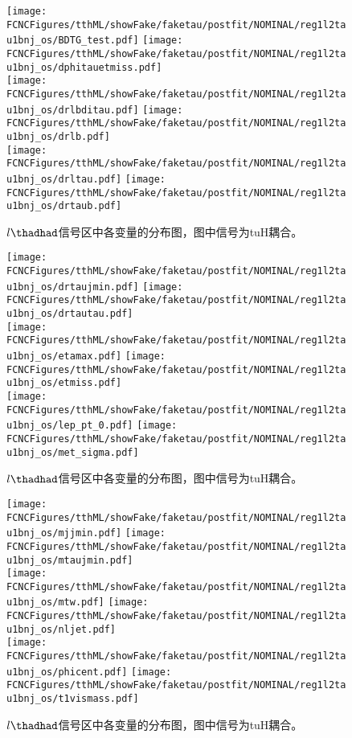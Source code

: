 \begin{figure}[H]
\centering
\texttt{[image: \\FCNCFigures/tthML/showFake/faketau/postfit/NOMINAL/reg1l2tau1bnj\_os/BDTG\_test.pdf]}
\texttt{[image: \\FCNCFigures/tthML/showFake/faketau/postfit/NOMINAL/reg1l2tau1bnj\_os/dphitauetmiss.pdf]}
\\
\texttt{[image: \\FCNCFigures/tthML/showFake/faketau/postfit/NOMINAL/reg1l2tau1bnj\_os/drlbditau.pdf]}
\texttt{[image: \\FCNCFigures/tthML/showFake/faketau/postfit/NOMINAL/reg1l2tau1bnj\_os/drlb.pdf]}
\\
\texttt{[image: \\FCNCFigures/tthML/showFake/faketau/postfit/NOMINAL/reg1l2tau1bnj\_os/drltau.pdf]}
\texttt{[image: \\FCNCFigures/tthML/showFake/faketau/postfit/NOMINAL/reg1l2tau1bnj\_os/drtaub.pdf]}
\\
\caption{$l\thadhad$信号区中各变量的分布图，图中信号为tuH耦合。}
\label{fig:var_reg1l2tau1bnj_os_0}
\end{figure}
\begin{figure}[H]
\centering
\texttt{[image: \\FCNCFigures/tthML/showFake/faketau/postfit/NOMINAL/reg1l2tau1bnj\_os/drtaujmin.pdf]}
\texttt{[image: \\FCNCFigures/tthML/showFake/faketau/postfit/NOMINAL/reg1l2tau1bnj\_os/drtautau.pdf]}
\\
\texttt{[image: \\FCNCFigures/tthML/showFake/faketau/postfit/NOMINAL/reg1l2tau1bnj\_os/etamax.pdf]}
\texttt{[image: \\FCNCFigures/tthML/showFake/faketau/postfit/NOMINAL/reg1l2tau1bnj\_os/etmiss.pdf]}
\\
\texttt{[image: \\FCNCFigures/tthML/showFake/faketau/postfit/NOMINAL/reg1l2tau1bnj\_os/lep\_pt\_0.pdf]}
\texttt{[image: \\FCNCFigures/tthML/showFake/faketau/postfit/NOMINAL/reg1l2tau1bnj\_os/met\_sigma.pdf]}
\\
\caption{$l\thadhad$信号区中各变量的分布图，图中信号为tuH耦合。}
\label{fig:var_reg1l2tau1bnj_os_1}
\end{figure}
\begin{figure}[H]
\centering
\texttt{[image: \\FCNCFigures/tthML/showFake/faketau/postfit/NOMINAL/reg1l2tau1bnj\_os/mjjmin.pdf]}
\texttt{[image: \\FCNCFigures/tthML/showFake/faketau/postfit/NOMINAL/reg1l2tau1bnj\_os/mtaujmin.pdf]}
\\
\texttt{[image: \\FCNCFigures/tthML/showFake/faketau/postfit/NOMINAL/reg1l2tau1bnj\_os/mtw.pdf]}
\texttt{[image: \\FCNCFigures/tthML/showFake/faketau/postfit/NOMINAL/reg1l2tau1bnj\_os/nljet.pdf]}
\\
\texttt{[image: \\FCNCFigures/tthML/showFake/faketau/postfit/NOMINAL/reg1l2tau1bnj\_os/phicent.pdf]}
\texttt{[image: \\FCNCFigures/tthML/showFake/faketau/postfit/NOMINAL/reg1l2tau1bnj\_os/t1vismass.pdf]}
\\
\caption{$l\thadhad$信号区中各变量的分布图，图中信号为tuH耦合。}
\label{fig:var_reg1l2tau1bnj_os_1}
\end{figure}
